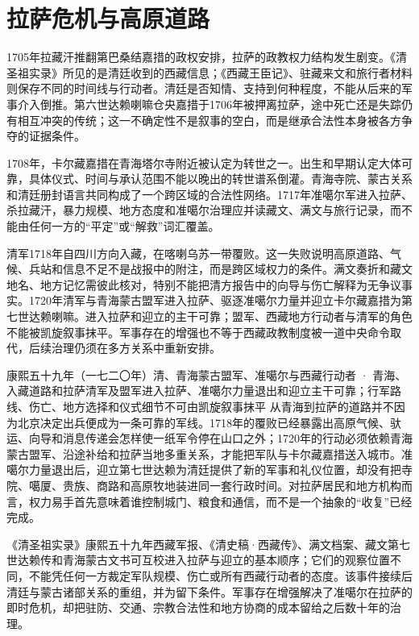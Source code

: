 \section{拉萨危机与高原道路}

1705年拉藏汗推翻第巴桑结嘉措的政权安排，拉萨的政教权力结构发生剧变。《清圣祖实录》所见的是清廷收到的西藏信息；《西藏王臣记》、驻藏来文和旅行者材料则保存不同的时间线与行动者。清廷是否知情、支持到何种程度，不能从后来的军事介入倒推。第六世达赖喇嘛仓央嘉措于1706年被押离拉萨，途中死亡还是失踪仍有相互冲突的传统；这一不确定性不是叙事的空白，而是继承合法性本身被各方争夺的证据条件。

1708年，卡尔藏嘉措在青海塔尔寺附近被认定为转世之一。出生和早期认定大体可靠，具体仪式、时间与承认范围不能以晚出的转世谱系倒灌。青海寺院、蒙古关系和清廷册封语言共同构成了一个跨区域的合法性网络。1717年准噶尔军进入拉萨、杀拉藏汗，暴力规模、地方态度和准噶尔治理应并读藏文、满文与旅行记录，而不能由任何一方的“平定”或“解救”词汇覆盖。

清军1718年自四川方向入藏，在喀喇乌苏一带覆败。这一失败说明高原道路、气候、兵站和信息不足不是战报中的附注，而是跨区域权力的条件。满文奏折和藏文地名、地方记忆需彼此核对，特别不能把清方报告中的向导与伤亡解释为无争议事实。1720年清军与青海蒙古盟军进入拉萨、驱逐准噶尔力量并迎立卡尔藏嘉措为第七世达赖喇嘛。进入拉萨和迎立的主干可靠；盟军、西藏地方行动者与清军的角色不能被凯旋叙事抹平。军事存在的增强也不等于西藏政教制度被一道中央命令取代，后续治理仍须在多方关系中重新安排。

\begin{event}{}{康熙五十九年（一七二〇年）}{清、青海蒙古盟军、准噶尔与西藏行动者 · 青海、入藏道路和拉萨}{清军及盟军进入拉萨、准噶尔力量退出和迎立主干可靠；行军路线、伤亡、地方选择和仪式细节不可由凯旋叙事抹平}
从青海到拉萨的道路并不因为北京决定出兵便成为一条可靠的军线。1718年的覆败已经暴露出高原气候、驮运、向导和消息传递会怎样使一纸军令停在山口之外；1720年的行动必须依赖青海蒙古盟军、沿途补给和拉萨当地多重关系，才能把军队与卡尔藏嘉措送入城市。准噶尔力量退出后，迎立第七世达赖为清廷提供了新的军事和礼仪位置，却没有把寺院、噶厦、贵族、商路和高原牧地装进同一套行政时间。对拉萨居民和地方机构而言，权力易手首先意味着谁控制城门、粮食和通信，而不是一个抽象的“收复”已经完成。

《清圣祖实录》康熙五十九年西藏军报、《清史稿·西藏传》、满文档案、藏文第七世达赖传和青海蒙古文书可互校进入拉萨与迎立的基本顺序；它们的观察位置不同，不能凭任何一方裁定军队规模、伤亡或所有西藏行动者的态度。该事件接续后清廷与蒙古诸部关系的重组，并为留下条件。军事存在增强解决了准噶尔在拉萨的即时危机，却把驻防、交通、宗教合法性和地方协商的成本留给之后数十年的治理。
\end{event}
